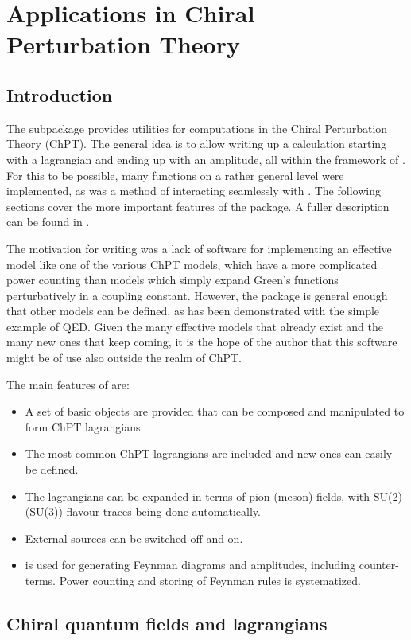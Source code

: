 \section{Applications in Chiral Perturbation Theory}

\subsection{Introduction}

The subpackage \fphi provides utilities for computations in the Chiral Perturbation Theory (ChPT). The general idea is to allow writing up a calculation starting with a lagrangian and ending up with an amplitude, all within the framework of \fc. For this to be possible, many functions on a rather general level were implemented, as was a method of interacting seamlessly with \fa. The following sections cover the more important features of the package. A fuller description can be found in \cite{PHI}.

The motivation for writing \fphi was a lack of software for implementing an effective model like one of the various ChPT models, which have a more complicated power counting than models which simply expand Green's functions perturbatively in a coupling constant. However, the package is general enough that other models can be defined, as has been demonstrated with the simple example of QED. Given the many effective models that already exist and the many new ones that keep coming, it is the hope of the author that this software might be of use also outside the realm of ChPT.

The main features of \fphi are:
\begin{itemize}
\item A set of basic objects are provided that can be composed and manipulated to form ChPT lagrangians.
\item The most common ChPT lagrangians are included and new ones can easily be defined.
\item The lagrangians can be expanded in terms of pion (meson) fields, with SU(2) (SU(3)) flavour traces being done automatically.
\item External sources can be switched off and on.
\item \fa is used for generating Feynman diagrams and amplitudes, including counter-terms. Power counting and storing of Feynman rules is systematized.
\end{itemize}

\subsection{Chiral quantum fields and lagrangians}

